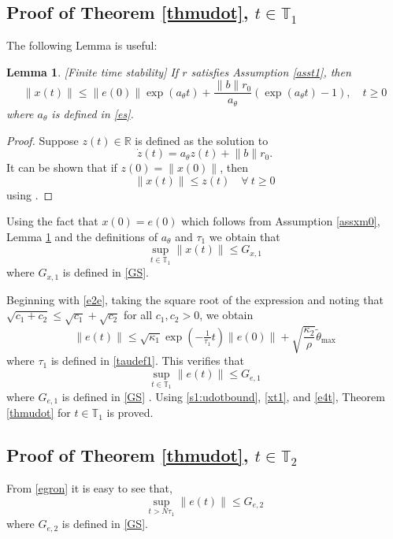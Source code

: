 \documentclass[10pt,journal]{IEEEtran}
\theoremstyle{plain}%
\newtheorem{lem}[thm]{Lemma}
\theoremstyle{definition}
\newcommand{\be}[0]{\begin{equation}}
\newcommand{\ee}[0]{\end{equation}}
\newcommand{\norms}[1]{\lVert#1\rVert}
\newcommand{\normB}[0]{\norms}
\let\norm=\normB
\renewcommand{\Re}[0]{\mathbb R}
\begin{document}
\subsection{Proof of Theorem \ref{thmudot}, $t\in\mathbb T_1$}
The following Lemma is useful:
\begin{lem}\label{lemfinx}[Finite time stability]
If $r$ satisfies Assumption \ref{asst1}, then
\be\label{finitex}
\norm{x(t)}  \leq  \norm{e(0)} \exp \left( a_\theta t \right) + \frac{\norm b r_0}{a_\theta}\left ( \exp(a_\theta t) - 1 \right ),\quad t\geq0
\ee
where $a_\theta$ is defined in \eqref{es}.
\end{lem}
\begin{proof}
Suppose $z(t)\in \Re$ is defined as the solution to
\be\label{zd}
\dot z(t)=a_\theta z(t) + \norm b r_0.
\ee
It can be shown that if $z(0)=\norm{x(0)}$, then
\be\label{zb}
\norm{x(t)}\leq z(t)\quad\forall\ t\geq0
\ee using \cite[Theorem 8.14]{dan70}.\end{proof} Using the fact that $x(0)=e(0)$ which follows from Assumption \ref{assxm0}, Lemma \ref{lemfinx} and the definitions of $a_\theta$ and $\tau_1$ we obtain that
\be\label{xt1}
\sup_{t\in \mathbb T_1} \norm{x(t)} \leq G_{x,1}
\ee
where $G_{x,1}$ is defined in \eqref{GS}. 



Beginning with \eqref{e2e}, taking the square root of the expression and noting that ${\sqrt{c_1+c_2}\leq \sqrt{c_1}+\sqrt{c_2}}$ for all ${c_1,c_2>0}$, we obtain
\be\label{egron}
\norm{e(t)} \leq \sqrt{\kappa_1} \exp \left(-\tfrac{1}{\tau_1} t \right) \norm{e(0)} + \sqrt{\frac{\kappa_2}{\rho}} {\tilde\theta_\text{max}}
\ee
where $\tau_1$ is defined in \eqref{taudef1}. This verifies that
\be\label{e4t}
\sup_{t\in\mathbb T_1} \norm{e(t)} \leq G_{e,1}
\ee 
where $G_{e,1}$ is defined in \eqref{GS} . Using \eqref{s1:udotbound}, \eqref{xt1}, and \eqref{e4t}, Theorem \ref{thmudot} for $t\in\mathbb T_1$ is proved.

 





\subsection{Proof of Theorem \ref{thmudot}, $t\in\mathbb T_2$}
From \eqref{egron}  it is easy to see that,
\be\label{e4t2}
\sup_{t>N\tau_1} \norm{e(t)} \leq G_{e,2}
\ee 
where $G_{e,2}$ is defined in \eqref{GS}.
\end{document}
